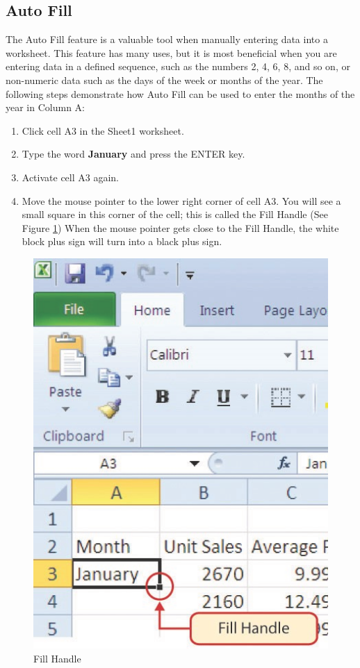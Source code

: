 \subsection{Auto Fill}

The Auto Fill feature is a valuable tool when manually entering data into a worksheet. This feature has many uses, but it is most beneficial when you are entering data in a defined sequence, such as the numbers 2, 4, 6, 8, and so on, or non-numeric data such as the days of the week or months of the year. The following steps demonstrate how Auto Fill can be used to enter the months of the year in Column A:

\begin{enumerate}
	\item Click cell \textsf{A3} in the Sheet1 worksheet.
	\item Type the word \textbf{January} and press the ENTER key.
	\item Activate cell \textsf{A3} again.
	\item Move the mouse pointer to the lower right corner of cell \textsf{A3}. You will see a small square in this corner of the cell; this is called the Fill Handle (See Figure \ref{01:fig18}) When the mouse pointer gets close to the Fill Handle, the white block plus sign will turn into a black plus sign.
\end{enumerate}

\begin{figure}[H]
	\centering
	\includegraphics[width=\maxwidth{.95\linewidth}]{gfx/ch01_fig18}
	\caption{Fill Handle}
	\label{01:fig18}
\end{figure}

